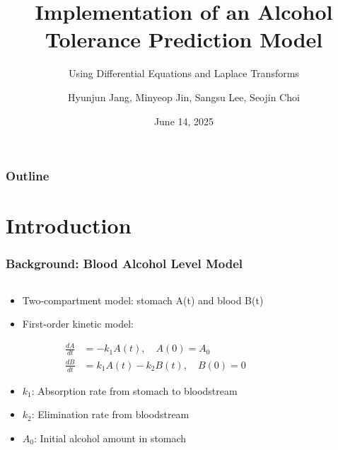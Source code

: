 \documentclass{beamer}
\title{Implementation of an Alcohol Tolerance Prediction Model}
\subtitle{Using Differential Equations and Laplace Transforms}
\author{Hyunjun Jang, Minyeop Jin, Sangsu Lee, Seojin Choi}
\institute{Korea Institute of Energy Technology (KENTECH)}
\date{June 14, 2025}
\begin{document}
\frame{\titlepage}

\begin{frame}
\frametitle{Outline}
\tableofcontents
\end{frame}

\section{Introduction}

\begin{frame}
\frametitle{Background: Blood Alcohol Level Model}
\begin{columns}
\begin{column}{0.6\textwidth}
\begin{itemize}
    \item Two-compartment model: stomach A(t) and blood B(t)
    \item First-order kinetic model:
\end{itemize}

\begin{align}
\frac{dA}{dt} &= -k_1 A(t), \quad A(0) = A_0 \\
\frac{dB}{dt} &= k_1 A(t) - k_2 B(t), \quad B(0) = 0
\end{align}

\begin{itemize}
    \item $k_1$: Absorption rate from stomach to bloodstream
    \item $k_2$: Elimination rate from bloodstream
    \item $A_0$: Initial alcohol amount in stomach
\end{itemize}
\end{column}

\begin{column}{0.4\textwidth}
\begin{center}
\end{center}
\end{column}
\end{columns}
\end{frame}
\end{document}
